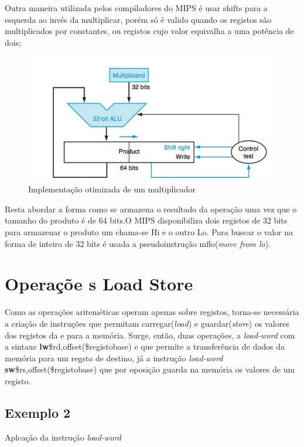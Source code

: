 \documentclass[10pt,a4paper]{book}
\begin{document}
		Outra maneira utilizada pelos compiladores do MIPS é usar shifts para a esquerda ao invés da multiplicar, porém só é valido quando os registos são multiplicados por constantes, ou registos cujo valor equivalha a uma potência de dois;

   			\begin{figure}[htp]
			    \centering
			    \includegraphics[scale=0.5]{mul2.png}
			    \caption{Implementação otimizada de um multiplicador}
			    \label{mul2}
			\end{figure}

		Resta abordar a forma como se armazena o resultado da operação uma vez que o tamanho do produto é de 64 bits.O MIPS disponibiliza dois registos de 32 bits para armazenar o produto um chama-se Hi e o outro Lo. Para buscar o valor na forma de inteiro de 32 bits é usada a pseudoinstrução mflo(\textit{move from lo}).




	\section{Operaçõe s Load Store}

	  Como as operações ariteméticas operam apenas sobre registos, torna-se necessária  a criação de instruções que permitam carregar(\textit{load}) e guardar(\textit{store}) os valores dos registos da e para a memória.
	  Surge, então, duas operações, a \textit{load-word} com a sintaxe \textbf{lw}\$rd,offset(\$registobase) e que permite a transferência de dados da memória para um regsto de destino, já a instrução \textit{load-word}  \textbf{sw}\$rs,offset(\$registobase) 	  que por oposição guarda na memória os valores de um registo.

	   \subsection{Exemplo 2}
	      Aplcação da instrução \textit{load-word}
\end{document}
